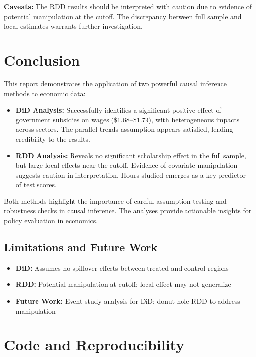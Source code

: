 \documentclass[a4paper,12pt,headsepline]{scrartcl} %
\begin{document}
\textbf{Caveats:}
The RDD results should be interpreted with caution due to evidence of potential manipulation at the cutoff. The discrepancy between full sample and local estimates warrants further investigation.

\section{Conclusion}

This report demonstrates the application of two powerful causal inference methods to economic data:

\begin{itemize}
    \item \textbf{DiD Analysis:} Successfully identifies a significant positive effect of government subsidies on wages (\$1.68--\$1.79), with heterogeneous impacts across sectors. The parallel trends assumption appears satisfied, lending credibility to the results.
    
    \item \textbf{RDD Analysis:} Reveals no significant scholarship effect in the full sample, but large local effects near the cutoff. Evidence of covariate manipulation suggests caution in interpretation. Hours studied emerges as a key predictor of test scores.
\end{itemize}

Both methods highlight the importance of careful assumption testing and robustness checks in causal inference. The analyses provide actionable insights for policy evaluation in economics.

\subsection{Limitations and Future Work}

\begin{itemize}
    \item \textbf{DiD:} Assumes no spillover effects between treated and control regions
    \item \textbf{RDD:} Potential manipulation at cutoff; local effect may not generalize
    \item \textbf{Future Work:} Event study analysis for DiD; donut-hole RDD to address manipulation
\end{itemize}

\section{Code and Reproducibility}
\end{document}
